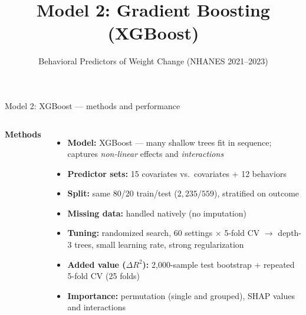 \documentclass[aspectratio=169,10pt]{beamer}
\title{Model 2: Gradient Boosting (XGBoost)}
\subtitle{Behavioral Predictors of Weight Change (NHANES 2021--2023)}
\begin{document}
\begin{frame}{Model 2: XGBoost --- methods and performance}
\begin{columns}[T,onlytextwidth]
\small\textbf{Methods}\par\vspace{2pt}
{\footnotesize
\begin{itemize}\setlength\itemsep{1pt}\setlength\parskip{0pt}
  \item \textbf{Model:} XGBoost --- many shallow trees fit in sequence; captures \emph{non-linear} effects and \emph{interactions}
  \item \textbf{Predictor sets:} 15 covariates vs.\ covariates + \alert{12 behaviors}
  \item \textbf{Split:} same 80/20 train/test ($2{,}235 / 559$), stratified on outcome
  \item \textbf{Missing data:} handled natively (no imputation)
  \item \textbf{Tuning:} randomized search, 60 settings $\times$ 5-fold CV $\rightarrow$ depth-3 trees, small learning rate, strong regularization
  \item \textbf{Added value ($\Delta R^2$):} 2,000-sample test bootstrap + repeated 5-fold CV (25 folds)
  \item \textbf{Importance:} permutation (single and grouped), SHAP values and interactions
\end{itemize}}


\end{columns}
\end{frame}
\end{document}

